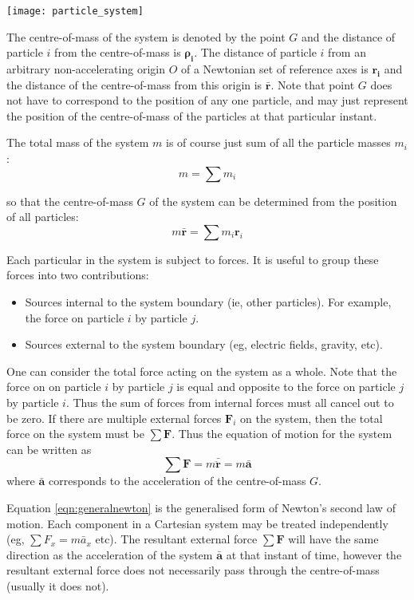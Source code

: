 \texttt{[image: particle\_system]}

The centre-of-mass of the system is denoted by the point $G$ and the distance of particle $i$ from the centre-of-mass is $\bm{\rho_i}$. The distance of particle $i$ from an arbitrary non-accelerating origin $O$ of a Newtonian set of reference axes is $\bm{r_i}$ and the distance of the centre-of-mass from this origin is $\bm{\bar{r}}$. Note that point $G$ does not have to correspond to the position of any one particle, and may just represent the position of the centre-of-mass of the particles at that particular instant.

The total mass of the system $m$ is of course just sum of all the particle masses $m_i$:
\begin{equation}
    m = \sum{m_i}
\end{equation}

so that the centre-of-mass $G$ of the system can be determined from the position of all particles:
\begin{equation}
    m \bm{\bar{r}} = \sum m_i \bm{r}_i
\end{equation}

Each particular in the system is subject to forces. It is useful to group these forces into two contributions:
\begin{itemize}
    \item Sources internal to the system boundary (ie, other particles). For example, the force on particle $i$ by particle $j$.
    \item Sources external to the system boundary (eg, electric fields, gravity, etc).
\end{itemize}

One can consider the total force acting on the system as a whole. Note that the force on on particle $i$ by particle $j$ is equal and opposite to the force on particle $j$ by particle $i$. Thus the sum of forces from internal forces must all cancel out to be zero. If there are multiple external forces $\bm{F}_i$ on the system, then the total force on the system must be $\sum\bm{F}$. Thus the equation of motion for the system can be written as
\begin{equation}
    \label{eqn:generalnewton}
    \sum\bm{F} = m \bm{\bar{\ddot{r}}} = m \bm{\bar{a}}
\end{equation}
where $\bm{\bar{a}}$ corresponds to the acceleration of the centre-of-mass $G$.

Equation \ref{eqn:generalnewton} is the generalised form of Newton's second law of motion. Each component in a Cartesian system may be treated independently (eg, $\sum F_x = m \bar{a}_x$ etc). The resultant external force $\sum\bm{F}$ will have the same direction as the acceleration of the system $\bm{\bar{a}}$ at that instant of time, however the resultant external force does not necessarily pass through the centre-of-mass (usually it does not).


